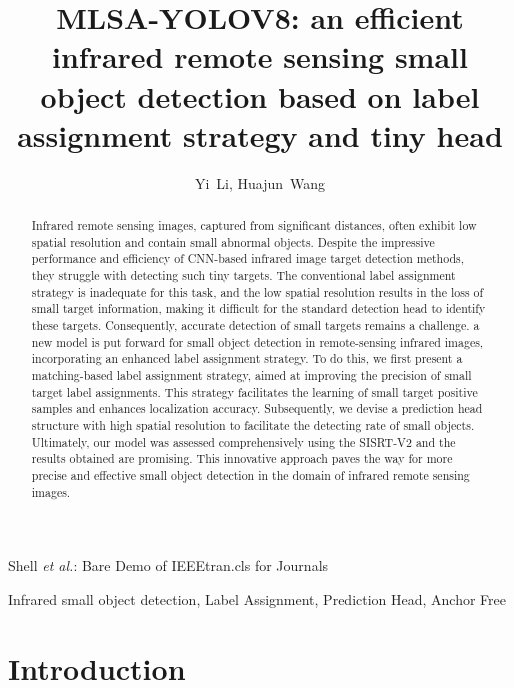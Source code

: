 \documentclass[journal]{IEEEtran}
\begin{document}
\title{MLSA-YOLOV8: an efficient infrared remote sensing small object detection based on label assignment strategy and tiny head}
\author{Yi~Li, Huajun~Wang}

\markboth{}%
{Shell \MakeLowercase{\textit{et al.}}: Bare Demo of IEEEtran.cls for Journals}

\maketitle

\begin{abstract}
Infrared remote sensing images, captured from significant distances, often exhibit low spatial resolution and contain small abnormal objects. Despite the impressive performance and efficiency of CNN-based infrared image target detection methods, they struggle with detecting such tiny targets. The conventional label assignment strategy is inadequate for this task, and the low spatial resolution results in the loss of small target information, making it difficult for the standard detection head to identify these targets. Consequently, accurate detection of small targets remains a challenge. a new model is put forward for small object detection in remote-sensing infrared images, incorporating an enhanced label assignment strategy. To do this, we first present a matching-based label assignment strategy, aimed at improving the precision of small target label assignments. This strategy facilitates the learning of small target positive samples and enhances localization accuracy. Subsequently, we devise a prediction head structure with high spatial resolution to facilitate the detecting rate of small objects. Ultimately, our model was assessed comprehensively using the SISRT-V2 and the results obtained are promising. This innovative approach paves the way for more precise and effective small object detection in the domain of infrared remote sensing images.

\end{abstract}

\begin{IEEEkeywords}
Infrared small object detection, Label Assignment, Prediction Head, Anchor Free
\end{IEEEkeywords}

\IEEEpeerreviewmaketitle

\section{Introduction}
\end{document}

